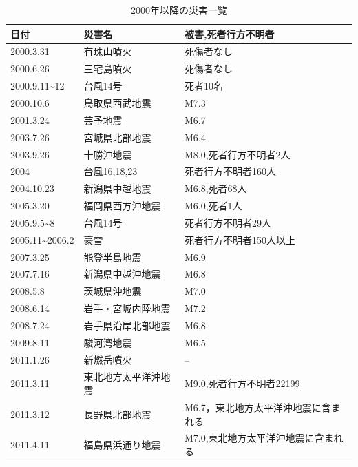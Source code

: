 \documentclass[a4j,11pt]{jsarticle}
\begin{document}
\begin{table}[htb]
  \begin{center} 
    \caption{2000年以降の災害一覧}
    \label{tab:saigai1}
    \begin{tabular}{|p{8em}|p{15em}|p{15em}|} \hline
    日付 & 災害名 & 被害,死者行方不明者\\ \hline \hline
    2000.3.31& 有珠山噴火& 死傷者なし \\ \hline
    2000.6.26 & 三宅島噴火 & 死傷者なし\\ \hline
    2000.9.11\textasciitilde12 & 台風14号&  死者10名\\ \hline
    2000.10.6 & 鳥取県西武地震& M7.3\\ \hline
    2001.3.24 & 芸予地震 & M6.7\\ \hline
    2003.7.26 & 宮城県北部地震& M6.4 \\ \hline
    2003.9.26 & 十勝沖地震&  M8.0,死者行方不明者2人\\ \hline
    2004 & 台風16,18,23   & 死者行方不明者160人\\ \hline
    2004.10.23 & 新潟県中越地震& M6.8,死者68人\\ \hline
    2005.3.20 & 福岡県西方沖地震& M6.0,死者1人\\ \hline
    2005.9.5\textasciitilde8 & 台風14号& 死者行方不明者29人\\ \hline
     2005.11\textasciitilde2006.2 & 豪雪& 死者行方不明者150人以上\\ \hline
      2007.3.25 & 能登半島地震& M6.9\\ \hline
      2007.7.16 & 新潟県中越沖地震& M6.8\\ \hline
      2008.5.8 & 茨城県沖地震& M7.0\\ \hline
      2008.6.14 & 岩手・宮城内陸地震& M7.2\\ \hline
      2008.7.24 & 岩手県沿岸北部地震& M6.8\\ \hline
      2009.8.11 & 駿河湾地震& M6.5\\ \hline
      2011.1.26 & 新燃岳噴火& --\\ \hline
      2011.3.11 & 東北地方太平洋沖地震& M9.0,死者行方不明者22199\cite{oka7}\\ \hline
      2011.3.12 & 長野県北部地震& M6.7，東北地方太平洋沖地震に含まれる\\ \hline
      2011.4.11 & 福島県浜通り地震& M7.0,東北地方太平洋沖地震に含まれる\\ \hline
      
    \end{tabular}
  \end{center}
\end{table}
\end{document}

